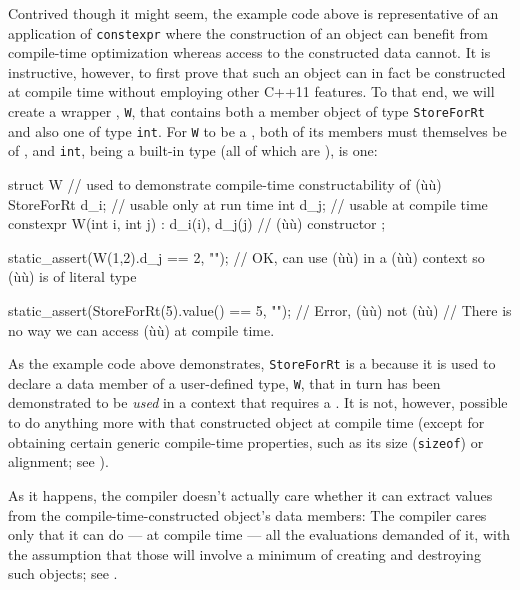 \noindent Contrived though it might seem, the example code above is representative
of an application of \lstinline!constexpr! where the construction of an
object can benefit from compile-time optimization whereas access to the
constructed data cannot. It is instructive, however, to first prove that
such an object can in fact be constructed at compile time without
employing other C++11 features. To that end, we will create a wrapper
, \lstinline!W!, that contains both a member object of
type \lstinline!StoreForRt! and also one of type \lstinline!int!. For
\lstinline!W! to be a , both of its members must
themselves be of , and \lstinline!int!, being a
built-in type (all of which are ), is one:

\begin{emcppslisting}[emcppsbatch=e4]
struct W  // used to demonstrate compile-time constructability of (ù{}ù)
{
    StoreForRt d_i;                                 // usable only at run time
    int        d_j;                                 // usable at compile time
    constexpr W(int i, int j) : d_i(i), d_j(j) { }  // (ù{}ù) constructor
};

static_assert(W(1,2).d_j == 2, "");
    // OK, can use (ù{}ù) in a (ù{}ù) context so (ù{}ù) is of literal type

static_assert(StoreForRt(5).value() == 5, "");  // Error, (ù{}ù) not (ù{}ù)
    // There is no way we can access (ù{}ù) at compile time.
\end{emcppslisting}


\noindent As the example code above demonstrates, \lstinline!StoreForRt! is a
 because it is used to declare a data member of a
user-defined type, \lstinline!W!, that in turn has been demonstrated to be
\emph{used} in a context that requires a .
It is not, however, possible to do anything more with that constructed
object at compile time (except for obtaining certain generic
compile-time properties, such as its size (\lstinline!sizeof!) or
alignment; see ).

As it happens, the compiler doesn't actually care whether it can extract
values from the compile-time-constructed object's data members: The
compiler cares only that it can do --- at compile time --- all the
evaluations demanded of it, with the assumption that those will involve
a minimum of creating and destroying such objects; see
.


